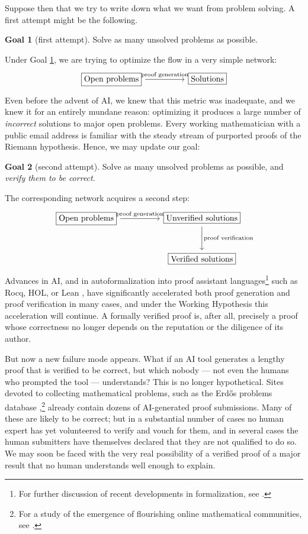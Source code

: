 \documentclass[12pt]{amsart}
\theoremstyle{definition}
\newtheorem{goal}{Goal}[section]
\begin{document}
Suppose then that we try to write down what we want from problem solving.  A first attempt might be the following.

\begin{goal}[first attempt]\label{goal1}
Solve as many unsolved problems as possible.
\end{goal}

Under Goal \ref{goal1}, we are trying to optimize the flow in a very simple network:
\[
\begin{tikzcd}[column sep=huge]
  \boxed{\text{Open problems}} \arrow[r, "\text{proof generation}"] & \boxed{\text{Solutions}}
\end{tikzcd}
\]
Even before the advent of AI, we knew that this metric was inadequate, and we knew it for an entirely mundane reason: optimizing it produces a large number of \emph{incorrect} solutions to major open problems.  Every working mathematician with a public email address is familiar with the steady stream of purported proofs of the Riemann hypothesis.  Hence, we may update our goal:

\begin{goal}[second attempt]\label{goal2}
Solve as many unsolved problems as possible, and \emph{verify them to be correct}.
\end{goal}

The corresponding network acquires a second step:
\[
\begin{tikzcd}[column sep=huge, row sep=large]
  \boxed{\text{Open problems}} \arrow[r, "\text{proof generation}"] & \boxed{\text{Unverified solutions}} \arrow[d, "\text{proof verification}"] \\
  & \boxed{\text{Verified solutions}}
\end{tikzcd}
\]
Advances in AI, and in autoformalization into proof assistant languages\footnote{For further discussion of recent developments in formalization, see \cite{avigad}.} such as Rocq, HOL, or Lean \cite{lean, mathlib}, have significantly accelerated both proof generation and proof verification in many cases, and under the Working Hypothesis this acceleration will continue.  A formally verified proof is, after all, precisely a proof whose correctness no longer depends on the reputation or the diligence of its author.

But now a new failure mode appears.  What if an AI tool generates a lengthy proof that is verified to be correct, but which nobody --- not even the humans who prompted the tool --- understands?  This is no longer hypothetical.  Sites devoted to collecting mathematical problems, such as the Erd\H{o}s problems database \cite{erdosproblems},\footnote{For a study of the emergence of flourishing online mathematical communities, see \cite{pease}.} already contain dozens of AI-generated proof submissions.  Many of these are likely to be correct; but in a substantial number of cases no human expert has yet volunteered to verify and vouch for them, and in several cases the human submitters have themselves declared that they are not qualified to do so.  We may soon be faced with the very real possibility of a verified proof of a major result that no human understands well enough to explain.
\end{document}

